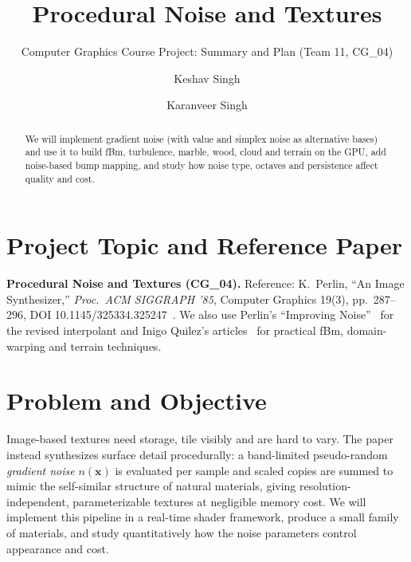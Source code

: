\documentclass[acmlarge,nonacm]{acmart}
\begin{document}
\title{Procedural Noise and Textures}
\subtitle{Computer Graphics Course Project: Summary and Plan (Team 11, CG\_04)}

\author{Keshav Singh}

\author{Karanveer Singh}

\begin{abstract}
We will implement gradient noise (with value and simplex noise as alternative bases) and use it to build fBm, turbulence, marble, wood, cloud and terrain on the GPU, add noise-based bump mapping, and study how noise type, octaves and persistence affect quality and cost.
\end{abstract}

\maketitle

\newpage{}
\begingroup
\small
\renewcommand\contentsname{Index}
\tableofcontents
\endgroup
\newpage{}

\section{Project Topic and Reference Paper}\label{sec:topic}
\textbf{Procedural Noise and Textures (CG\_04).} Reference: K.~Perlin, ``An Image Synthesizer,'' \emph{Proc.\ ACM SIGGRAPH '85}, Computer Graphics 19(3), pp.~287--296, DOI 10.1145/325334.325247~\cite{perlin1985}. We also use Perlin's ``Improving Noise''~\cite{perlin2002} for the revised interpolant and Inigo Quilez's articles~\cite{iq} for practical fBm, domain-warping and terrain techniques.

\section{Problem and Objective}\label{sec:problem}
Image-based textures need storage, tile visibly and are hard to vary. The paper instead synthesizes surface detail procedurally: a band-limited pseudo-random \emph{gradient noise} $n(\mathbf{x})$ is evaluated per sample and scaled copies are summed to mimic the self-similar structure of natural materials, giving resolution-independent, parameterizable textures at negligible memory cost. We will implement this pipeline in a real-time shader framework, produce a small family of materials, and study quantitatively how the noise parameters control appearance and cost.
\end{document}
